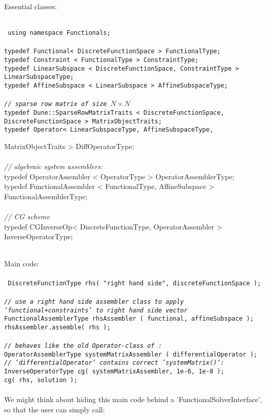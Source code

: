 \documentclass[a4paper,11pt]{article}
\numberwithin{equation}{section}
\begin{document}
Essential classes: \\
\\
{\footnotesize\tt
using namespace Functionals;\\
\\
typedef Functional< DiscreteFunctionSpace > FunctionalType; \\
typedef Constraint < FunctionalType > ConstraintType; \\
typedef LinearSubspace < DiscreteFunctionSpace, ConstraintType > LinearSubspaceType; \\
typedef AffineSubspace < LinearSubspace > AffineSubspaceType; \\
\\
{\sl// sparse row matrix of size $N \times N$}\\
typedef Dune::SparseRowMatrixTraits < DiscreteFunctionSpace, DiscreteFunctionSpace >  MatrixObjectTraits; \\
typedef Operator< LinearSubspaceType, AffineSubspaceType,

MatrixObjectTraits > DiffOperatorType; \\
\\
{\sl// algebraic system assemblers:}\\
typedef OperatorAssembler < OperatorType > OperatorAssemblerType; \\
typedef FunctionalAssembler < FunctionalType, AffineSubspace > FunctionalAssemblerType; \\
\\
{\sl// CG scheme}\\
typedef CGInverseOp< DiscreteFunctionType, OperatorAssembler > InverseOperatorType; \\
}
\\
Main code: \\
\\
{\tt\footnotesize
DiscreteFunctionType rhs( "right hand side", discreteFunctionSpace ); \\
\\
{\sl// use a right hand side assembler class to apply 'functional+constraints' to right hand side vector}\\
FunctionalAssemblerType rhsAssembler ( functional, affineSubspace ); \\
rhsAssembler.assemble( rhs ); \\
\\
{\sl// behaves like the old Operator-class of \dunefem:}\\
OperatorAssemblerType systemMatrixAssembler ( differentialOperator );
\\
{\sl// 'differentialOperator' contains correct 'systemMatrix()':}\\
InverseOperatorType cg( systemMatrixAssembler, 1e-6, 1e-8 );\\
cg( rhs, solution );\\}
\\
We might think about hiding this main code behind a 'FunctionalSolverInterface', so that the user can simply call:
\end{document}
